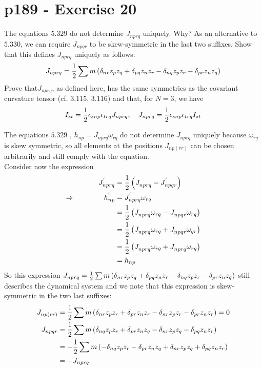 \section{p189 - Exercise 20}
\begin{tcolorbox}
The equations $\mathbf{5.329}$ do not determine $J_{nprq}$ uniquely. Why? As an alternative to $\mathbf{5.330}$, we can require $J_{npqr}$ to be skew-symmetric in the last two suffixes. Show that this defines $J_{nprq}$ uniquely as follows:
$$J_{nprq}= \frac{1}{2}\sum m \left(\delta_{nr}z_pz_q +\delta_{pq}z_nz_r-\delta_{nq}z_pz_r-\delta_{pr}z_nz_q \right)$$
Prove that$J_{nprq}$, as defined here, has the same symmetries as the covariant curvature tensor (cf. $\mathbf{3.115}$, $\mathbf{3.116}$) and that, for $N=3$, we have
$$ I_{st} = \frac{1}{2}\epsilon_{snp}\epsilon_{trq}J_{nprq}, \quad  J_{nprq}=  \frac{1}{2}\epsilon_{snp}\epsilon_{trq} I_{st}$$
\end{tcolorbox} 
The equations $\mathbf{5.329}$ , $h_{np}=J_{nprq}\omega_{rq}$ do not determine $J_{nprq}$ uniquely because $\omega_{rq}$ is skew symmetric, so all elements at the positions $J_{np(rr)}$ can be chosen arbitrarily and still comply with the equation.\\
Consider now the expression
\begin{align}
J^{'}_{nprq}&= \frac{1}{2}\left(  J^{}_{nprq}-J^{'}_{npqr}\right)\\
\Rightarrow \quad\quad\quad\quad h^{'}_{np}&=J^{'}_{nprq}\omega_{rq}\\
&=  \frac{1}{2}\left(  J^{}_{nprq}\omega_{rq}-J^{}_{npqr}\omega_{rq}\right)\\
&= \frac{1}{2}\left(  J^{}_{nprq}\omega_{rq}+J^{}_{npqr}\omega_{qr}\right)\\
&= \frac{1}{2}\left(  J^{}_{nprq}\omega_{rq}+J^{}_{nprq}\omega_{rq}\right)\\
&=h_{np}
\end{align}
So this expression $J_{nprq}= \frac{1}{2}\sum m \left(\delta_{nr}z_pz_q +\delta_{pq}z_nz_r-\delta_{nq}z_pz_r-\delta_{pr}z_nz_q \right)$ still describes the dynamical system and we note that this expression is skew-symmetric in the two last suffixes:
\begin{align}
J_{np(rr)}&= \frac{1}{2}\sum m \left(\delta_{nr}z_pz_r +\delta_{pr}z_nz_r-\delta_{nr}z_pz_r-\delta_{pr}z_nz_r \right)=0\\
J_{npqr}&= \frac{1}{2}\sum m \left(\delta_{nq}z_pz_r +\delta_{pr}z_nz_q-\delta_{nr}z_pz_q-\delta_{pq}z_nz_r \right)\\
&=-\frac{1}{2}\sum m \left(-\delta_{nq}z_pz_r -\delta_{pr}z_nz_q+\delta_{nr}z_pz_q+\delta_{pq}z_nz_r \right)\\
&= - J_{nprq}
\end{align}

